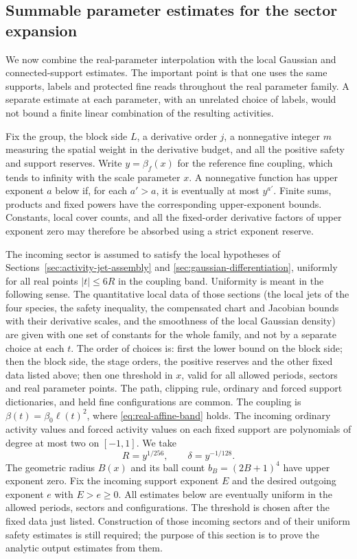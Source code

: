 \subsection{Summable parameter estimates for the sector expansion}
\label{sec:sector-analytic-prices}
We now combine the real-parameter interpolation with the local
Gaussian and connected-support estimates. The important point is
that one uses the same supports, labels and protected fine reads
throughout the real parameter family. A separate estimate at each
parameter, with an unrelated choice of labels, would not bound a
finite linear combination of the resulting activities.

Fix the group, the block side $L$, a derivative order $j$, a
nonnegative integer $m$ measuring the spatial weight in the derivative
budget, and all the positive safety and support reserves. Write
$y=\beta_f(x)$ for the reference fine coupling, which tends to
infinity with the scale parameter $x$. A nonnegative function has
upper exponent $a$ below if, for each $a'>a$, it is eventually at
most $y^{a'}$. Finite sums, products and fixed powers have the
corresponding upper-exponent bounds. Constants, local cover counts,
and all the fixed-order derivative factors of upper exponent zero
may therefore be absorbed using a strict exponent reserve.

The incoming sector is assumed to satisfy the local hypotheses of
Sections~\ref{sec:activity-jet-assembly} and
\ref{sec:gaussian-differentiation}, uniformly for all real points
$|t|\le6R$ in the coupling band. Uniformity is meant in the
following sense. The quantitative local data of those sections (the
local jets of the four species, the safety inequality, the
compensated chart and Jacobian bounds with their derivative scales,
and the smoothness of the local Gaussian density) are given with one
set of constants for the whole family, and not by a separate choice
at each $t$. The order of choices is: first the lower bound on the
block side; then the block side, the stage orders, the positive
reserves and the other fixed data listed above; then one threshold
in $x$, valid for all allowed periods, sectors and real parameter
points. The path, clipping rule, ordinary
and forced support dictionaries, and held fine configurations are
common. The coupling is $\beta(t)=\beta_0\ell(t)^2$, where
\eqref{eq:real-affine-band} holds. The incoming ordinary activity
values and forced activity values on each fixed support are
polynomials of degree at most two on $[-1,1]$. We take
\begin{equation}\label{eq:sector-radius-choice}
                       R=y^{1/256},\qquad \delta=y^{-1/128}.
\end{equation}
The geometric radius $B(x)$ and its ball count $b_B=(2B+1)^4$
have upper exponent zero. Fix the incoming support exponent $E$ and
the desired outgoing exponent $e$ with $E>e\ge0$.
All estimates below are eventually uniform in the allowed periods,
sectors and configurations. The threshold is chosen after the fixed
data just listed. Construction of those incoming sectors and of
their uniform safety estimates is still required; the purpose of
this section is to prove the analytic output estimates from them.

